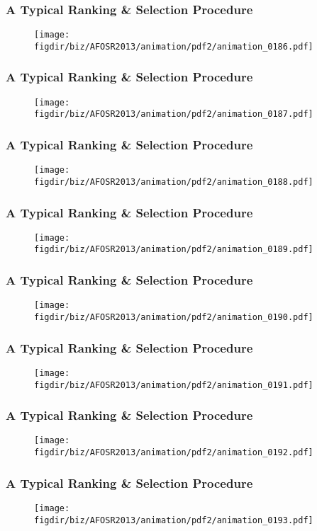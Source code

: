 \documentclass[13pt]{beamer}
\newcommand{\figdir}{../../fig}
\begin{document}
\begin{frame}\frametitle{A Typical Ranking \& Selection Procedure}\begin{figure}\texttt{[image: \\figdir/biz/AFOSR2013/animation/pdf2/animation\_0186.pdf]}\end{figure}\end{frame}
\begin{frame}\frametitle{A Typical Ranking \& Selection Procedure}\begin{figure}\texttt{[image: \\figdir/biz/AFOSR2013/animation/pdf2/animation\_0187.pdf]}\end{figure}\end{frame}
\begin{frame}\frametitle{A Typical Ranking \& Selection Procedure}\begin{figure}\texttt{[image: \\figdir/biz/AFOSR2013/animation/pdf2/animation\_0188.pdf]}\end{figure}\end{frame}
\begin{frame}\frametitle{A Typical Ranking \& Selection Procedure}\begin{figure}\texttt{[image: \\figdir/biz/AFOSR2013/animation/pdf2/animation\_0189.pdf]}\end{figure}\end{frame}
\begin{frame}\frametitle{A Typical Ranking \& Selection Procedure}\begin{figure}\texttt{[image: \\figdir/biz/AFOSR2013/animation/pdf2/animation\_0190.pdf]}\end{figure}\end{frame}
\begin{frame}\frametitle{A Typical Ranking \& Selection Procedure}\begin{figure}\texttt{[image: \\figdir/biz/AFOSR2013/animation/pdf2/animation\_0191.pdf]}\end{figure}\end{frame}
\begin{frame}\frametitle{A Typical Ranking \& Selection Procedure}\begin{figure}\texttt{[image: \\figdir/biz/AFOSR2013/animation/pdf2/animation\_0192.pdf]}\end{figure}\end{frame}
\begin{frame}\frametitle{A Typical Ranking \& Selection Procedure}\begin{figure}\texttt{[image: \\figdir/biz/AFOSR2013/animation/pdf2/animation\_0193.pdf]}\end{figure}\end{frame}
\end{document}
